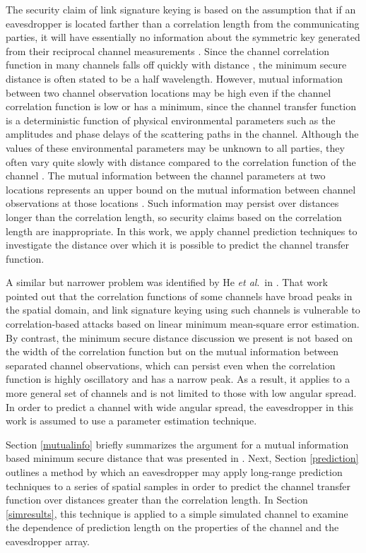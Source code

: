 \documentclass{allertonproc}
\begin{document}
The security claim of link signature keying is based on the assumption that if an eavesdropper is located farther than a correlation length from the communicating parties, it will have essentially no information about the symmetric key generated from their reciprocal channel measurements \cite{azimisadjadi2007, bloch2008, mathur2008, ye2010, he2013}.  Since the channel correlation function in many channels falls off quickly with distance \cite{jakes1974}, the minimum secure distance is often stated to be a half wavelength.  However, mutual information between two channel observation locations may be high even if the channel correlation function is low or has a minimum, since the channel transfer function is a deterministic function of physical environmental parameters such as the amplitudes and phase delays of the scattering paths in the channel.  Although the values of these environmental parameters may be unknown to all parties, they often vary quite slowly with distance compared to the correlation function of the channel \cite{jakes1974, duel-hallen2007}.  The mutual information between the channel parameters at two locations represents an upper bound on the mutual information between channel observations at those locations \cite{kckpVTC2015}.  Such information may persist over distances longer than the correlation length, so security claims based on the correlation length are inappropriate.  In this work, we apply channel prediction techniques \cite{duel-hallen2007} to investigate the distance over which it is possible to predict the channel transfer function.

A similar but narrower problem was identified by He \emph{et al}.~in \cite{he2013}.  That work pointed out that the correlation functions of some channels have broad peaks in the spatial domain, and link signature keying using such channels is vulnerable to correlation-based attacks based on linear minimum mean-square error estimation.  By contrast, the minimum secure distance discussion we present is not based on the width of the correlation function but on the mutual information between separated channel observations, which can persist even when the correlation function is highly oscillatory and has a narrow peak.  As a result, it applies to a more general set of channels and is not limited to those with low angular spread.  In order to predict a channel with wide angular spread, the eavesdropper in this work is assumed to use a parameter estimation technique.

Section \ref{mutualinfo} briefly summarizes the argument for a mutual information based minimum secure distance that was presented in \cite{kckpVTC2015}.  Next, Section \ref{prediction} outlines a method by which an eavesdropper may apply long-range prediction techniques to a series of spatial samples in order to predict the channel transfer function over distances greater than the correlation length.  In Section \ref{simresults}, this technique is applied to a simple simulated channel to examine the dependence of prediction length on the properties of the channel and the eavesdropper array. 
\end{document}

